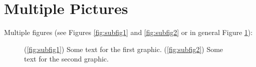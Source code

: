 \section{Multiple Pictures}
Multiple figures (see Figures \ref{fig:subfig1} and \ref{fig:subfig2} or in general Figure \ref{fig:subfigs}):
\begin{figure}[H]
  \centering
  \caption[Caption for multiple graphics in the list of figures]{(\ref{fig:subfig1}) Some text for the first graphic. (\ref{fig:subfig2}) Some text for the second graphic.}
  \label{fig:subfigs}
\end{figure}
\noindent